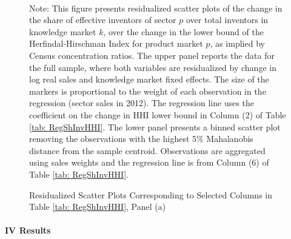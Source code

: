 \begin{figure}
\caption{Residualized Scatter Plots Corresponding to Selected Columns in Table
\ref{tab: RegShInvHHI}, Panel (a)\label{fig: scattersDksh}}


\\

\raggedright{}{\small{}Note: This figure presents residualized scatter
plots of the change in the share of effective inventors of sector
$p$ over total inventors in knowledge market $k$, over the change
in the lower bound of the Herfindal-Hirschman Index for product market
$p$, as implied by Census concentration ratios. The upper panel reports
the data for the full sample, where both variables are residualized
by change in log real sales and knowledge market fixed effects. The
size of the markers is proportional to the weight of each observation
in the regression (sector sales in 2012). The regression line uses
the coefficient on the change in HHI lower bound in Column (2) of
Table }\ref{tab: RegShInvHHI}{\small{}. The lower panel presents
a binned scatter plot removing the observations with the highest 5\%
Mahalanobis distance from the sample centroid. Observations are aggregated
using sales weights and the regression line is from Column (6) of
Table }\ref{tab: RegShInvHHI}{\small{}.}{\small\par}
\end{figure}


\paragraph{IV Results}

